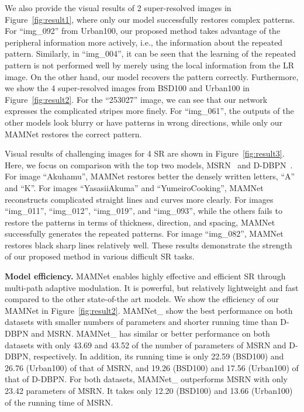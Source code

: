 \documentclass[final,5p,times,twocolumn]{elsarticle}
\begin{document}
We also provide the visual results of 2 super-resolved images in Figure~\ref{fig:result1}, where only our model successfully restores complex patterns.
For ``img\_092'' from Urban100, our proposed method takes advantage of the peripheral information more actively, i.e., the information about the repeated pattern.
Similarly, in ``img\_004'', it can be seen that the learning of the repeated pattern is not performed well by merely using the local information from the LR image. 
On the other hand, our model recovers the pattern correctly.
Furthermore, we show the 4 super-resolved images from BSD100 and Urban100 in Figure~\ref{fig:result2}.
For the ``253027'' image, we can see that our network expresses the complicated stripes more finely.
For ``img\_061'', the outputs of the other models look blurry or have patterns in wrong directions, while only our MAMNet restores the correct pattern.

Visual results of challenging images for 4 SR are shown in Figure~\ref{fig:result3}.
Here, we focus on comparison with the top two models, MSRN~\cite{li2018multi} and D-DBPN~\cite{haris2018deep}.
For image ``Akuhamu'', MAMNet restores better the densely written letters, ``A'' and ``K''.
For images ``YasasiiAkuma'' and ``YumeiroCooking'', MAMNet reconstructs complicated straight lines and curves more clearly. 
For images ``img\_011'', ``img\_012'', ``img\_019'', and ``img\_093'', while the others fails to restore the patterns in terms of thickness, direction, and spacing, MAMNet successfully generates the repeated patterns. 
For image ``img\_082'', MAMNet restores black sharp lines relatively well.
These results demonstrate the strength of our proposed method in various difficult SR tasks.





\textbf{Model efficiency.}
MAMNet enables highly effective and efficient SR through multi-path adaptive modulation.
It is powerful, but relatively lightweight and fast compared to the other state-of-the art models.
We show the efficiency of our MAMNet in Figure~\ref{fig:result2}.
MAMNet\_ show the best performance on both datasets with smaller numbers of parameters and shorter running time than D-DBPN and MSRN.
MAMNet\_ has similar or better performance on both datasets with only 43.69 and 43.52 of the number of parameters of MSRN and D-DBPN, respectively.
In addition, its running time is only 22.59 (BSD100) and 26.76 (Urban100) of that of MSRN, and 19.26 (BSD100) and 17.56 (Urban100) of that of D-DBPN. 
For both datasets, MAMNet\_ outperforms MSRN with only 23.42 parameters of MSRN.
It takes only 12.20 (BSD100) and 13.66 (Urban100) of the running time of MSRN.
\end{document}

